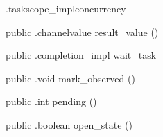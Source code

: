 \begin{CrexxClass}{.taskscope\_impl}{concurrency}
\begin{Members}
    \Method
      {public}
      {.channelvalue}
      {result\_value}
      {()}

    \Method
      {public}
      {.completion\_impl}
      {wait\_task}
      {}

    \Method
      {public}
      {.void}
      {mark\_observed}
      {()}

    \Method
      {public}
      {.int}
      {pending}
      {()}

    \Method
      {public}
      {.boolean}
      {open\_state}
      {()}

  \end{Members}
\end{CrexxClass}

